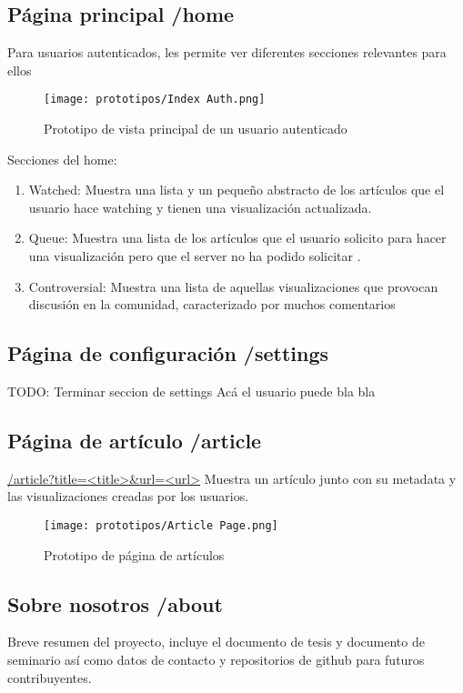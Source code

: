 \subsection{Página principal /home}
Para usuarios autenticados, les permite ver diferentes secciones relevantes para ellos

\begin{figure}[H]
    \centering
    \texttt{[image: prototipos/Index Auth.png]}
    \caption{Prototipo de vista principal de un usuario autenticado}
    \label{PrototipoHomePage}
\end{figure}


Secciones del home:
\begin{enumerate}
    \item Watched: Muestra una lista y un pequeño abstracto de los artículos que el usuario hace watching y tienen una visualización actualizada.
    \item Queue:  Muestra una lista de los artículos que el usuario solicito para hacer una visualización pero que el server no ha podido solicitar
.    \item Controversial:  Muestra una lista de aquellas visualizaciones que provocan discusión en la comunidad, caracterizado por muchos comentarios
\end{enumerate}

\subsection{Página de configuración /settings}
TODO: Terminar seccion de settings
Acá el usuario puede bla bla

\subsection{Página de artículo /article}
\url{/article?title=<title>&url=<url>}
Muestra un artículo junto con su metadata y las visualizaciones creadas por los usuarios.

\begin{figure}[H]
    \centering
    \texttt{[image: prototipos/Article Page.png]}
    \caption{Prototipo de página de artículos}
    \label{PrototipoSettingsPage}
\end{figure}

\subsection{Sobre nosotros /about}
Breve resumen del proyecto, incluye el documento de tesis y documento de seminario así como datos de contacto y repositorios de github para futuros contribuyentes.

